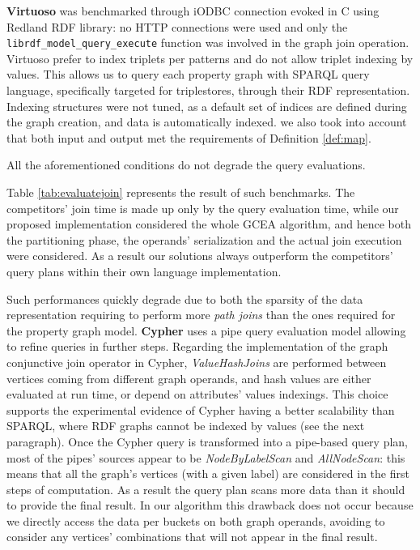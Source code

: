 \textbf{Virtuoso} was benchmarked through iODBC connection
evoked in C using Redland RDF library: no HTTP connections were used and only the
\texttt{librdf\_\-model\_\-query\_\-execute} function was involved in the graph join
operation. Virtuoso prefer to index triplets per patterns and
do not allow triplet indexing by values.
This allows us to query each property graph with SPARQL query language, specifically targeted for
triplestores, through their RDF representation.
Indexing structures were not tuned, as a default set of indices are defined during the
graph creation, and data is automatically indexed.
we also took into account that both input and output met the requirements of Definition \vref{def:map}.

All the aforementioned conditions do not degrade the query evaluations.

Table \ref{tab:evaluatejoin} represents the result of such benchmarks. The competitors'
join time is made up only by the query evaluation time, while our proposed implementation
considered the whole GCEA algorithm, and hence both the partitioning phase, the operands' serialization
and the actual join execution were considered. As a result  our solutions
always outperform the competitors' query plans within their own language
implementation.


Such performances quickly degrade due to both the sparsity of the data representation
requiring to
perform more \textit{path joins} than the ones required for the property graph model.
\textbf{Cypher} uses a pipe query evaluation model allowing to refine queries in further steps. Regarding the implementation
of the graph conjunctive join operator in Cypher, \textit{ValueHashJoins} are performed between vertices coming
from different graph operands, and hash values are either evaluated at run time, or depend on attributes' values
indexings. This choice supports the experimental evidence of Cypher having a better scalability than SPARQL, where
RDF graphs cannot be indexed by values (see the next paragraph). Once the Cypher query is transformed into a pipe-based
query plan, most of the pipes' sources appear to be \textit{NodeByLabelScan} and \textit{AllNodeScan}:
this means that all the graph's vertices (with a given label) are considered in the first steps of computation.
As a result the query
plan scans more data than it should to provide the final result. In our algorithm this drawback does not occur because
we directly access the data per buckets on both graph operands, avoiding to consider any vertices' combinations
that will not appear in the final result.
